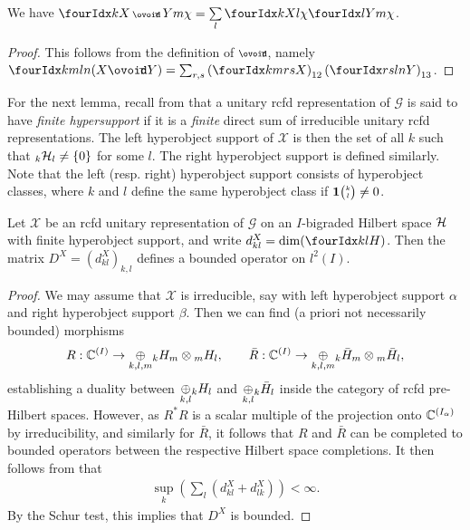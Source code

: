  \begin{Lem} \label{LemCharMult} We have $\Gr{\chi}{}{X\smCirct Y}{k}{m}= \underset{l}{\sum}\, \Gr{\chi}{}{X}{k}{l}\Gr{\chi}{}{Y}{l}{m}$.
 \end{Lem}
 
 \begin{proof} 
 This follows from the definition of $\smCirct$, namely $\Gr{(X\Circt Y)}{k}{l}{m}{n} = \sum_{r,s} \left(\Gr{X}{k}{r}{m}{s}\right)_{12} \left(\Gr{Y}{r}{l}{s}{n}\right)_{13}$.
 \end{proof}

For the next lemma, recall from \cite{DCT1} that a unitary rcfd representation of $\mathscr{G}$ is said to have \emph{finite hypersupport} if it is a \emph{finite} direct sum of irreducible unitary rcfd representations.  The left hyperobject support of $\mathscr{X}$ is then the set of all $k$ such that $\GrDA{\Hsp}{k}{l}\neq \{0\}$ for some $l$. The right hyperobject support is defined similarly. Note that the left (resp. right) hyperobject support consists of  hyperobject classes, where $k$ and $l$ define the same hyperobject class if $\UnitC{k}{l}\neq0$. 


 \begin{Lem} \label{LemBoundDim} Let $\mathscr{X}$ be an rcfd unitary
   representation of $\mathscr{G}$ on an $I$-bigraded Hilbert space $\Hsp$ with finite hyperobject support, and write $d^X_{kl} = \dim(\Gru{H}{k}{l})$. Then the matrix $D^X = (d^X_{kl})_{k,l}$ defines a bounded operator on $l^2(I)$. 
  \end{Lem}
  \begin{proof} We may assume that $\mathscr{X}$ is irreducible, say
    with left hyperobject support $\alpha$ and right hyperobject support
    $\beta$. Then we can find (a priori not necessarily bounded)
    morphisms \[R: \C^{(I)}\rightarrow \underset{k,l,m}{\oplus} \GrDA{H}{k}{m}\otimes
    \GrDA{H}{m}{l},\qquad \bar{R}: \C^{(I)} \rightarrow \underset{k,l,m}{\oplus}
    \GrDA{\bar{H}}{k}{m}\otimes \GrDA{\bar{H}}{m}{l},\] establishing a
    duality between $\underset{k,l}{\oplus} \GrDA{H}{k}{l}$ and
    $\underset{k,l}{\oplus}\GrDA{\bar{H}}{k}{l}$ inside the category of
    rcfd pre-Hilbert spaces. However, as $R^*R$ is a scalar multiple
    of the projection onto $\C^{(I_{\alpha})}$ by irreducibility, and
    similarly for $\bar{R}$, it follows that $R$ and $\bar{R}$ can be
    completed to bounded operators between the respective Hilbert
    space completions. It then follows from \cite[Lemma A.3.2]{DCY1}
    that 
    \begin{align} \label{eq:dim-estimate}
  \sup_k (\sum_l (d_{kl}^X+d_{lk}^X)) < \infty.    
    \end{align}
 By the Schur test,
    this implies that $D^X$ is bounded.
\end{proof} 



